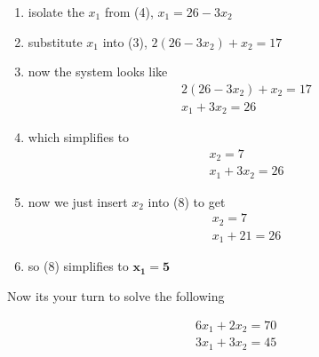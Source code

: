 \documentclass{article}
\begin{document}
\begin{enumerate}
\item \color{blou} isolate the $x_1$ from (4), $x_1 = 26 - 3x_2$  \color{black}
\item  \color{rooj} substitute $x_1$ into (3), $2 (26 - 3x_2) + x_2 = 17$ \color{black}
\item now the system looks like
\begin{align}
& 2 (26 - 3x_2) + x_2 = 17 \\ 
& x_1 + 3x_2 = 26      
\end{align}
\item \color{groen} which simplifies to  \color{black}
\begin{align}
& x_2 = 7 \\ 
& x_1 + 3x_2 = 26      
\end{align}
\item \color{rooj} now we just insert $x_2$ into (8)  to get \color{black}
\begin{align}
& x_2 = 7 \\ 
& x_1 + 21 = 26      
\end{align}
\item \color{groen} so (8) simplifies to $\mathbf{x_1 = 5}$ \color{black}

\end{enumerate}

Now its your turn to solve the following 

\begin{align*}
& 6x_1 + 2x_2 = 70 \\
& 3x_1 + 3x_2 = 45 
\end{align*}
\end{document}
